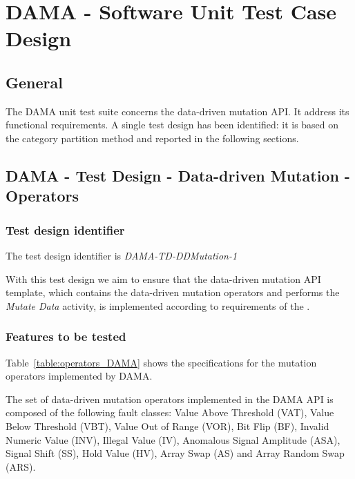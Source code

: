 
\chapter{DAMA - Software Unit Test Case Design}
\label{chap:design_DAMA}


\section{General}


The DAMA unit test suite concerns the data-driven mutation API. It address its functional requirements. A single test design has been identified: it is based on the category partition method and reported in the following sections.


\section{DAMA - Test Design - Data-driven Mutation - Operators}

\subsection{Test design identifier}

The test design identifier is \emph{DAMA-TD-DDMutation-1}

With this test design we aim to ensure that the data-driven mutation API template, which contains the data-driven mutation operators and performs the \emph{Mutate Data} activity, is implemented according to requirements of the \FAQAS.

\subsection{Features to be tested}

Table~\ref{table:operators_DAMA} shows the specifications for the mutation operators implemented by DAMA.

The set of data-driven mutation operators implemented in the DAMA API is composed of the following fault classes: Value Above Threshold (VAT), Value Below Threshold (VBT), Value Out of Range (VOR), Bit Flip (BF), Invalid Numeric Value (INV), Illegal Value (IV), Anomalous Signal Amplitude (ASA), Signal Shift (SS), Hold Value (HV), Array Swap (AS) and Array Random Swap (ARS).

